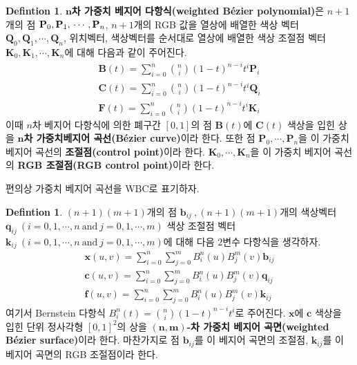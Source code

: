 \documentclass{gshs_thesis}
\theoremstyle{theorem}
\theoremstyle{lemma}
\theoremstyle{definition}
\newtheorem{definition}[theorem]{Defintion}
\begin{document}
\begin{definition} \label{WBC}
	\textbf{$\boldsymbol{n}$차 가중치 베지어 다항식(weighted Bézier polynomial)}은 $n+1$개의 점 $\mathbf{P}_0, \mathbf{P}_1, \\  \cdots, \mathbf{P}_n$,  $n+1$개의 RGB 값을 열상에 배열한 색상 벡터 $\mathbf{Q}_0, \mathbf{Q}_1, \cdots, \mathbf{Q}_n$, 위치벡터, 색상벡터를 순서대로 열상에 배열한 색상 조절점 벡터 $\mathbf{K}_0, \mathbf{K}_1, \cdots, \mathbf{K}_n$에 대해 다음과 같이 주어진다.
	\begin{equation}
		\begin{split}
		   \mathbf{B}(t)=\sum_{i=0}^n \binom ni(1-t)^{n-i}t^i\mathbf{P}_i  \\
		    \mathbf{C}(t)=\sum_{i=0}^n \binom ni(1-t)^{n-i}t^i\mathbf{Q}_i  \\
		    \mathbf{F}(t)=\sum_{i=0}^n \binom ni(1-t)^{n-i}t^i\mathbf{K}_i
		\end{split}		
    	\label{eq003}
	\end{equation}
	이때 $n$차 베지어 다항식에 의한 폐구간 $[0, 1]$의 점 $\mathbf{B}(t)$에 $\mathbf{C}(t)$ 색상을 입힌 상을 \textbf{$\boldsymbol{n}$차 가중치베지어 곡선(Bézier curve)}이라 한다. 또한 점 $\mathbf{P}_0, \cdots, \mathbf{P}_n$을 이 가중치 베지어 곡선의 \textbf{조절점(control point)}이라 한다. $\mathbf{K}_0, \cdots, \mathbf{K}_n$을 이 가중치 베지어 곡선의 \textbf{RGB 조절점(RGB control point)}이라 한다.
\end{definition}
편의상 가중치 베지어 곡선을 WBC로 표기하자.
\begin{definition} \label{WBS}
	$(n+1)(m+1)$개의 점 $\mathbf{b}_{ij}\ , (n+1)(m+1)$개의 색상벡터 $\mathbf{q}_{ij}\ (i=0, 1, \cdots, n\ \mathrm{and}\ j=0, 1, \cdots, m)$ 색상 조절점 벡터 $\mathbf{k}_{ij}\ (i=0, 1, \cdots, n\ \mathrm{and}\ j=0, 1, \cdots, m)$에 대해 다음 $2$변수 다항식을 생각하자. 
	\begin{equation}
		\begin{split}
		\mathbf{x}(u, v)=\sum_{i=0}^n\sum_{j=0}^m B_i^n(u)B_j^m(v)\mathbf{b}_{ij}  \\  
		\mathbf{c}(u, v)=\sum_{i=0}^n\sum_{j=0}^m B_i^n(u)B_j^m(v)\mathbf{q}_{ij}  \\
		\mathbf{f}(u, v)=\sum_{i=0}^n\sum_{j=0}^m B_i^n(u)B_j^m(v)\mathbf{k}_{ij}
		\end{split}
	  \label{eq004}
	\end{equation}
	여기서 Bernstein 다항식 $B_i^n(t)=\binom ni(1-t)^{n-i}t^i$로 주어진다. $\mathbf{x}$에 $\mathbf{c}$ 색상을 입힌 단위 정사각형 $[0, 1]^2$의 상을 \textbf{$\boldsymbol{(n, m)}$-차 가중치 베지어 곡면(weighted Bézier surface)}이라 한다. 마찬가지로 점 $\mathbf{b}_{ij}$를 이 베지어 곡면의 조절점, $\mathbf{k}_{ij}$를 이 베지어 곡면의 RGB 조절점이라 한다.
\end{definition}
\end{document}
